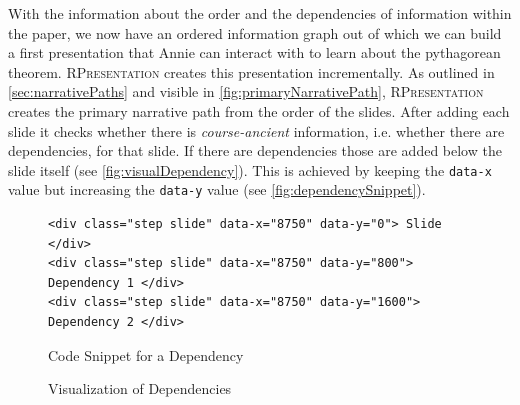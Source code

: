 \documentclass[twoside, 12pt]{article}
\newcommand{\sys}{\textsc{RPresentation}\xspace}
\begin{document}
\begin{figure}
\vspace{-50pt}
\end{figure}

With the information about the order and the dependencies of information within the paper, we now have an ordered information graph out of which we can build a first presentation that Annie can interact with to learn about the pythagorean theorem. \sys creates this presentation incrementally. As outlined in \autoref{sec:narrativePaths} and visible in \autoref{fig:primaryNarrativePath}, \sys creates the primary narrative path from the order of the slides. After adding each slide it checks whether there is \textit{course-ancient} information, i.e. whether there are dependencies, for that slide. If there are dependencies those are added below the slide itself (see \autoref{fig:visualDependency}). This is achieved by keeping the \texttt{data-x} value but increasing the \texttt{data-y} value (see \autoref{fig:dependencySnippet}).\\

\begin{figure}
\vspace{-26pt}
\begin{verbatim}
<div class="step slide" data-x="8750" data-y="0"> Slide </div>
<div class="step slide" data-x="8750" data-y="800"> Dependency 1 </div>
<div class="step slide" data-x="8750" data-y="1600"> Dependency 2 </div>
\end{verbatim}
\vspace{-5pt}
  \caption{Code Snippet for a Dependency}
  \label{fig:dependencySnippet}
  \vspace{12pt}
\end{figure}

\begin{figure}
\vspace{-26pt}
  \begin{center}
\vspace{-5pt}
  \caption{Visualization of Dependencies}
  \label{fig:visualDependency}
\vspace{-24pt}
  \end{center}
\end{figure}
\end{document}
